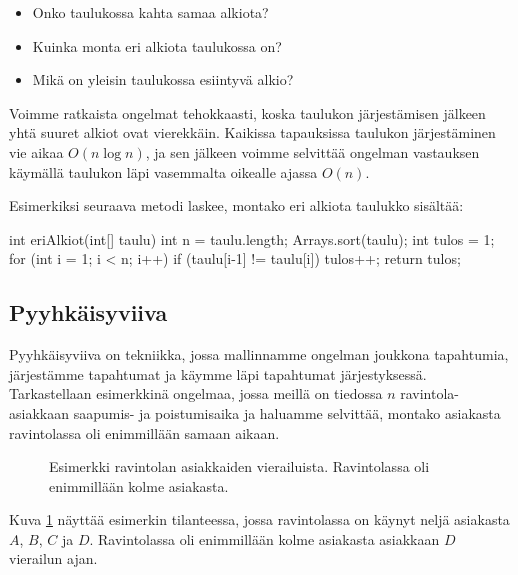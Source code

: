 \begin{itemize}
\item Onko taulukossa kahta samaa alkiota?
\item Kuinka monta eri alkiota taulukossa on?
\item Mikä on yleisin taulukossa esiintyvä alkio?
\end{itemize}

Voimme ratkaista ongelmat tehokkaasti, koska taulukon järjestämisen
jälkeen yhtä suuret alkiot ovat vierekkäin.
Kaikissa tapauksissa taulukon järjestäminen vie aikaa $O(n \log n)$,
ja sen jälkeen voimme selvittää ongelman vastauksen
käymällä taulukon läpi vasemmalta oikealle ajassa $O(n)$.

Esimerkiksi seuraava metodi laskee, montako eri alkiota
taulukko sisältää:

\begin{code}
int eriAlkiot(int[] taulu) {
    int n = taulu.length;
    Arrays.sort(taulu);
    int tulos = 1;
    for (int i = 1; i < n; i++) {
        if (taulu[i-1] != taulu[i]) tulos++;
    }
    return tulos;
}
\end{code}

\subsection{Pyyhkäisyviiva}

Pyyhkäisyviiva on tekniikka, jossa mallinnamme ongelman joukkona
tapahtumia, järjestämme tapahtumat ja käymme läpi tapahtumat
järjestyksessä.
Tarkastellaan esimerkkinä ongelmaa, jossa meillä on tiedossa
$n$ ravintola-asiakkaan saapumis- ja poistumisaika
ja haluamme selvittää, montako asiakasta ravintolassa oli
enimmillään samaan aikaan.

\begin{figure}
\center
{}
\caption{Esimerkki ravintolan asiakkaiden vierailuista.
Ravintolassa oli enimmillään kolme asiakasta.}
\label{fig:pyyvii}
\end{figure}

Kuva \ref{fig:pyyvii} näyttää esimerkin tilanteessa,
jossa ravintolassa on käynyt neljä asiakasta $A$, $B$, $C$ ja $D$.
Ravintolassa oli enimmillään kolme asiakasta
asiakkaan $D$ vierailun ajan.

